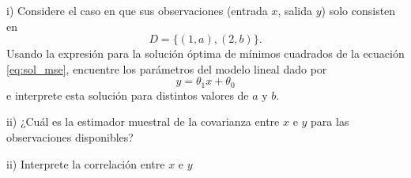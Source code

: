 i) Considere el caso en que sus observaciones (entrada $x$, salida $y$) solo consisten en 
\begin{equation}
D = \{(1,a),(2,b)\}.
\end{equation}
Usando la expresión para la solución óptima de mínimos cuadrados de la ecuación \eqref{eq:sol_mse}, encuentre los parámetros del modelo lineal dado por 
\begin{equation}
	y = \theta_1 x +\theta_0 
\end{equation}
e interprete esta solución para distintos valores de $a$ y $b$.

ii) ¿Cuál es la estimador muestral de la covarianza entre $x$ e $y$ para las observaciones disponibles? 

ii) Interprete la correlación entre $x$ e $y$ 




